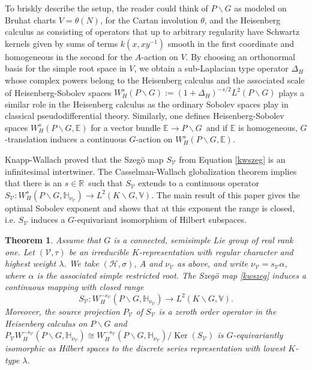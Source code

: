 \documentclass[a4paper,reqno]{amsart}
\numberwithin{equation}{section}
\def\ker{\operatorname{Ker}}
\def\R{\mathbb{R}}
\newtheorem{thm1}{Theorem}
\theoremstyle{definition}
\theoremstyle{remark}
\begin{document}
To briskly describe the setup, the reader could think of $P\backslash G$ as modeled on Bruhat charts $V=\theta(N)$, for the Cartan involution $\theta$, and the Heisenberg calculus as consisting of operators that up to arbitrary regularity have Schwartz kernels given by sums of terms $k(x,xy^{-1})$ smooth in the first coordinate and homogeneous in the second for the $A$-action on $V$. By choosing an orthonormal basis for the simple root space in $V$, we obtain a sub-Laplacian type operator $\Delta_H$ whose complex powers belong to the Heisenberg calculus and the associated scale of Heisenberg-Sobolev spaces $W^s_H(P\backslash G):=(1+\Delta_H)^{-s/2}L^2(P\backslash G)$ plays a similar role in the Heisenberg calculus as the ordinary Sobolev spaces play in classical pseudodifferential theory. Similarly, one defines Heisenberg-Sobolev spaces $W^s_H(P\backslash G,\mathbb{E})$ for a vector bundle $\mathbb{E}\to P\backslash G$ and if $\mathbb{E}$ is homogeneous, $G$-translation induces a continuous $G$-action on $W^s_H(P\backslash G,\mathbb{E})$. 

Knapp-Wallach \cite{knappwallach} proved that the Szegö map $S_{\mathcal{V}}$ from Equation \eqref{kwszeg} is an infinitesimal intertwiner. The Casselman-Wallach globalization theorem \cite{krobern,cassglob,wallachasy} implies that there is an $s\in \R$ such that $S_{\mathcal{V}}$ extends to a continuous operator $S_{\mathcal{V}}: W^{s}_{H}(P\backslash G, \mathbb{H}_{\nu_{\mathcal{V}}})\to L^2(K \backslash G,\mathbb{V})$. The main result of this paper gives the optimal Sobolev exponent and shows that at this exponent the range is closed, i.e. $S_{\mathcal{V}}$ induces a $G$-equivariant isomorphism of Hilbert subspaces. 





\begin{thm1}
\label{conja}
Assume that $G$ is a connected, semisimple Lie group of real rank one. Let $(\mathcal{V},\tau)$ be an irreducible $K$-representation with regular character and highest weight $\lambda$. We take $(\mathcal{H},\sigma)$, $A$ and $\nu_{\mathcal{V}}$ as above, and write $\nu_\mathcal{V}=s_\mathcal{V}\alpha$,
where $\alpha$ is the associated simple restricted root. The Szegö map \eqref{kwszeg} induces a continuous mapping with closed range
$$S_{\mathcal{V}}: W^{-s_{\mathcal{V}}}_{H}(P\backslash G, \mathbb{H}_{\nu_{\mathcal{V}}})\to L^2(K \backslash G,\mathbb{V}).$$
Moreover, the source projection $P_{\mathcal{V}}$ of $S_{\mathcal{V}}$ is a zeroth order operator in the Heisenberg calculus on $P\backslash G$ and $P_{\mathcal{V}}W^{-s_\mathcal{V}}_{H}(P\backslash G, \mathbb{H}_{\nu_{\mathcal{V}}})\cong W^{-s_\mathcal{V}}_{H}(P\backslash G, \mathbb{H}_{\nu_{\mathcal{V}}})/\ker(S_{\mathcal{V}})$ is $G$-equivariantly isomorphic as Hilbert spaces to the discrete series representation with lowest $K$-type $\lambda$.
\end{thm1}
\end{document}
